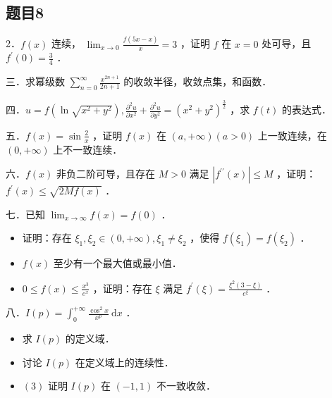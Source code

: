 \documentclass{article}
\begin{document}
\subsection{题目8}
2．\(f(x)\) 连续， \(\lim _{x \rightarrow 0} \frac{f(5 x-x)}{x}=3\) ，证明 \(f\) 在 \(x=0\) 处可导，且 \(f^{\prime}(0)=\frac{3}{4}\) ．

三．求幂级数 \(\sum_{n=0}^{\infty} \frac{x^{2 n+1}}{2 n+1}\) 的收敛半径，收敛点集，和函数．

四．\(u=f\left(\ln \sqrt{x^{2}+y^{2}}\right), \frac{\partial^{2} u}{\partial x^{2}}+\frac{\partial^{2} u}{\partial y^{2}}=\left(x^{2}+y^{2}\right)^{\frac{3}{2}}\) ，求 \(f(t)\) 的表达式．

五．\(f(x)=\sin \frac{2}{x}\) ，证明 \(f(x)\) 在 \((a,+\infty)(a>0)\) 上一致连续，在 \((0,+\infty)\) 上不一致连续．

六．\(f(x)\) 非负二阶可导，且存在 \(M>0\) 满足 \(\left|f^{\prime \prime}(x)\right| \leq M\) ，证明：\(f^{\prime}(x) \leq \sqrt{2 M f(x)}\) ．

七．已知 \(\lim _{x \rightarrow \infty} f(x)=f(0)\) ．

\begin{itemize}
  \item[（1）] 证明：存在 \(\xi_{1}, \xi_{2} \in(0,+\infty), \xi_{1} \neq \xi_{2}\) ，使得 \(f\left(\xi_{1}\right)=f\left(\xi_{2}\right)\) ．
  \item[（2）] \(f(x)\) 至少有一个最大值或最小值．
  \item[（3）] \(0 \leq f(x) \leq \frac{x^{3}}{e^{x}}\) ，证明：存在 \(\xi\) 满足 \(f^{\prime}(\xi)=\frac{\xi^{2}(3-\xi)}{e^{\xi}}\) ．
\end{itemize}

八．\(I(p)=\int_{0}^{+\infty} \frac{\cos ^{2} x}{x^{p}} \mathrm{~d} x\) ．

\begin{itemize}
  \item[（1）] 求 \(I(p)\) 的定义域．
  \item[（2）] 讨论 \(I(p)\) 在定义域上的连续性．
  \item[] \((3)\) 证明 \(I(p)\) 在 \((-1,1)\) 不一致收敛．
\end{itemize}
\end{document}
